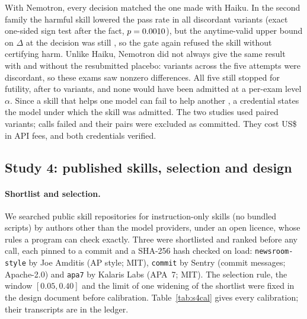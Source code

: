 With Nemotron, every decision matched the one made with Haiku. In the second family the harmful skill lowered the pass rate in all \NLnBHarmDisc{} discordant variants (exact one-sided sign test after the fact, $p=0.0010$), but the anytime-valid upper bound on $\Delta$ at the decision was still \NLnBHarmUcb, so the gate again refused the skill without certifying harm. Unlike Haiku, Nemotron did not always give the same result with and without the resubmitted placebo: \NLnResubDisc{} variants across the five attempts were discordant, so these exams saw nonzero differences. All five still stopped for futility, after \NLnResubNmin{} to \NLnResubNmax{} variants, and none would have been admitted at a per-exam level $\alpha$. Since a skill that helps one model can fail to help another \citep{yu2026masa,yang2026webdevskills}, a credential states the model under which the skill was admitted. The two studies used \NLnPairs{} paired variants; \NLnFailed{} calls failed and their pairs were excluded as committed. They cost US\$\NLnTotalCost{} in API fees, and both credentials verified.

\subsection{Study 4: published skills, selection and design}
\label{app:live-extra}
\paragraph{Shortlist and selection.} We searched public skill repositories for instruction-only skills (no bundled scripts) by authors other than the model providers, under an open licence, whose rules a program can check exactly. Three were shortlisted and ranked before any call, each pinned to a commit and a SHA-256 hash checked on load: \texttt{newsroom-style} by Joe Amditis (AP style; MIT), \texttt{commit} by Sentry (commit messages; Apache-2.0) and \texttt{apa7} by Kalaris Labs (APA~7; MIT). The selection rule, the window $[0.05,0.40]$ and the limit of one widening of the shortlist were fixed in the design document before calibration. Table~\ref{tab:s4cal} gives every calibration; their transcripts are in the ledger.

